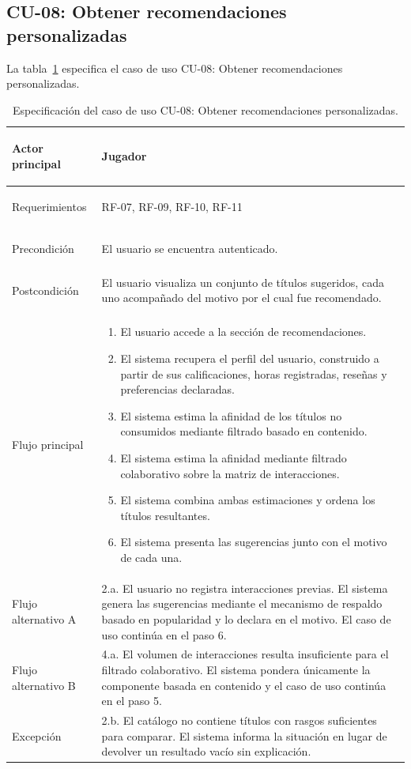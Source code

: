 \subsection{CU-08: Obtener recomendaciones personalizadas}\label{subsec:cu08}

La tabla~\ref{tab:cu08} especifica el caso de uso CU-08: Obtener recomendaciones personalizadas.

\begin{longtable}{|>{\bfseries\raggedright\arraybackslash}p{2.8cm}|>{\raggedright\arraybackslash}p{10cm}|}
	\caption{Especificación del caso de uso CU-08: Obtener recomendaciones personalizadas.}\label{tab:cu08} \\
	\hline
	\endfirsthead
	\hline
	\endfoot
	\hline
	\endlastfoot
	Actor principal & Jugador \\
	\hline
	Requerimientos & RF-07, RF-09, RF-10, RF-11 \\
	\hline
	Precondición & El usuario se encuentra autenticado. \\
	\hline
	Postcondición & El usuario visualiza un conjunto de títulos sugeridos, cada uno acompañado del motivo por el cual fue recomendado. \\
	\hline
	Flujo principal &
	\begin{enumerate}[leftmargin=1.1em, itemsep=2pt, topsep=2pt]
		\item El usuario accede a la sección de recomendaciones.
		\item El sistema recupera el perfil del usuario, construido a partir de sus calificaciones, horas registradas, reseñas y preferencias declaradas.
		\item El sistema estima la afinidad de los títulos no consumidos mediante filtrado basado en contenido.
		\item El sistema estima la afinidad mediante filtrado colaborativo sobre la matriz de interacciones.
		\item El sistema combina ambas estimaciones y ordena los títulos resultantes.
		\item El sistema presenta las sugerencias junto con el motivo de cada una.
	\end{enumerate} \\
	\hline
	Flujo alternativo A & 2.a. El usuario no registra interacciones previas. El sistema genera las sugerencias mediante el mecanismo de respaldo basado en popularidad y lo declara en el motivo. El caso de uso continúa en el paso 6. \\
	\hline
	Flujo alternativo B & 4.a. El volumen de interacciones resulta insuficiente para el filtrado colaborativo. El sistema pondera únicamente la componente basada en contenido y el caso de uso continúa en el paso 5. \\
	\hline
	Excepción & 2.b. El catálogo no contiene títulos con rasgos suficientes para comparar. El sistema informa la situación en lugar de devolver un resultado vacío sin explicación. \\
\end{longtable}

